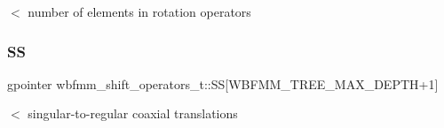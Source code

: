 $<$ number of elements in rotation operators \mbox{\label{structwbfmm__shift__operators__t_a60f777706a8e58b89a18976d8fcc02c9}} 
\subsubsection{SS}
{\footnotesize\ttfamily gpointer wbfmm\+\_\+shift\+\_\+operators\+\_\+t\+::\+SS[W\+B\+F\+M\+M\+\_\+\+T\+R\+E\+E\+\_\+\+M\+A\+X\+\_\+\+D\+E\+P\+TH+1]}

$<$ singular-\/to-\/regular coaxial translations 